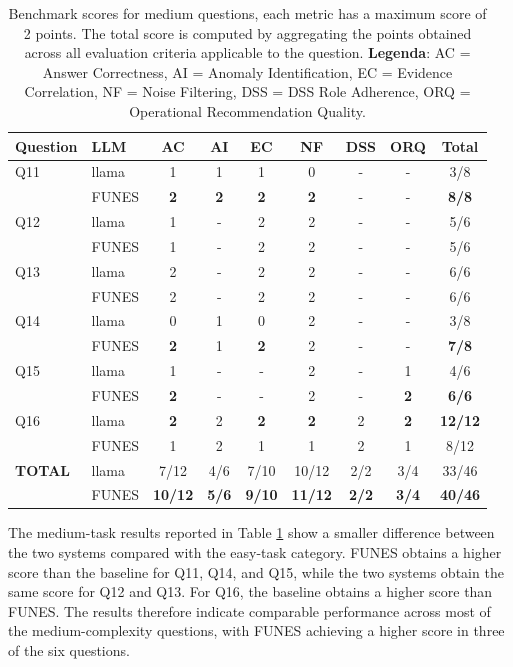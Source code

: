 \begin{table}[htbp]
\centering
\caption{Benchmark scores for medium questions, each metric has a maximum score of 2 points. The total score is computed by aggregating the points obtained across all evaluation criteria applicable to the question. \textbf{Legenda}: AC = Answer Correctness, AI = Anomaly Identification, EC = Evidence Correlation, NF = Noise Filtering, DSS = DSS Role Adherence, ORQ = Operational Recommendation Quality.}
\label{tab: medium_question_results}
\begin{tabular}{llccccccc}
\toprule
\textbf{Question} & \textbf{LLM} & \textbf{AC} & \textbf{AI} & \textbf{EC} & \textbf{NF} & \textbf{DSS} & \textbf{ORQ} & \textbf{Total} \\
\midrule
Q11 & llama & 1 & 1 & 1 & 0 & - & - & 3/8 \\
   & FUNES & \textbf{2} & \textbf{2} & \textbf{2} & \textbf{2} & - & - & \textbf{8/8} \\
\hline
Q12 & llama & 1 & - & 2 & 2 & - & - & 5/6 \\
   & FUNES & 1 & - & 2 & 2 & - & - & 5/6 \\
\hline
Q13 & llama & 2 & - & 2 & 2 & - & - & 6/6 \\
   & FUNES & 2 & - & 2 & 2 & - & - & 6/6 \\
\hline
Q14 & llama & 0 & 1 & 0 & 2 & - & - & 3/8 \\
   & FUNES & \textbf{2} & 1 & \textbf{2} & 2 & - & - & \textbf{7/8} \\
\hline
Q15 & llama & 1 & - & - & 2 & - & 1 & 4/6 \\
   & FUNES & \textbf{2} & - & - & 2 & - & \textbf{2} & \textbf{6/6} \\
\hline
Q16 & llama & \textbf{2} & 2 & \textbf{2} & \textbf{2} & 2 & \textbf{2} & \textbf{12/12} \\
   & FUNES & 1 & 2 & 1 & 1 & 2 & 1 & 8/12 \\
\midrule
\midrule
\textbf{TOTAL} & llama & 7/12 & 4/6 & 7/10 & 10/12 & 2/2 & 3/4 & 33/46 \\
                & FUNES & \textbf{10/12} & \textbf{5/6} & \textbf{9/10} & \textbf{11/12} & \textbf{2/2} & \textbf{3/4} & \textbf{40/46} \\
\bottomrule
\end{tabular}
\end{table}


The medium-task results reported in Table \ref{tab: medium_question_results} show a smaller difference between the two systems compared with the easy-task category. FUNES obtains a higher score than the baseline for Q11, Q14, and Q15, while the two systems obtain the same score for Q12 and Q13. For Q16, the baseline obtains a higher score than FUNES. The results therefore indicate comparable performance across most of the medium-complexity questions, with FUNES achieving a higher score in three of the six questions.

